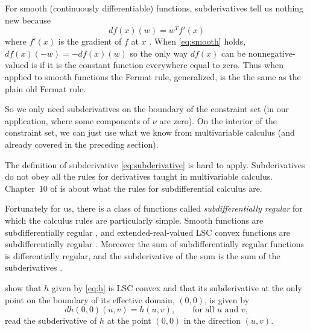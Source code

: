 For smooth (continuously differentiable) functions,
subderivatives tell us nothing new because
\begin{equation} \label{eq:smooth}
   d f(x)(w) = w^T f'(x)
\end{equation}
where $f'(x)$ is the gradient of $f$ at $x$
\citep[Exercise~8.20]{rockafellar-wets}.
When \eqref{eq:smooth} holds, $d f(x)(- w) = - d f(x)(w)$ so the only way
$d f(x)$ can be nonnegative-valued is if it is the constant function everywhere
equal to zero.  Thus when applied to smooth functions the Fermat rule,
generalized, is the the same as the plain old Fermat rule.

So we only need subderivatives
on the boundary of the constraint set (in our application,
where some components of $\nu$ are
zero).  On the interior of the constraint set, we can just use what we know
from multivariable calculus (and already covered in the preceding section).

The definition of subderivative \eqref{eq:subderivative} is hard to apply.
Subderivatives do not obey all the rules for derivatives taught
in multivariable calculus.  Chapter~10 of \citet{rockafellar-wets}
is about what the rules for subdifferential calculus are.

Fortunately for us, there is a class of functions called
\emph{subdifferentially regular} \citep[Definition~7.25]{rockafellar-wets}
for which the calculus rules are particularly simple.
Smooth functions are subdifferentially regular
\citep[Exercise~8.20]{rockafellar-wets}, and
extended-real-valued LSC convex functions are subdifferentially regular
\citep[Proposition~8.21]{rockafellar-wets}.
Moreover the sum of subdifferentially regular functions is differentially
regular, and the subderivative of the sum is the sum of the subderivatives
\citep[Corollary~10.9]{rockafellar-wets}.

\citet[Section~1.10.2]{reaster-tr} show that $h$ given by \eqref{eq:h}
is LSC convex and that its subderivative at the only point on the boundary
of its effective domain, $(0, 0)$, is given by
\begin{equation} \label{eq:d-h}
   d h(0, 0)(u, v) = h(u, v), \qquad \text{for all $u$ and $v$},
\end{equation}
read the subderivative of $h$ at the point $(0, 0)$ in the direction
$(u, v)$.

